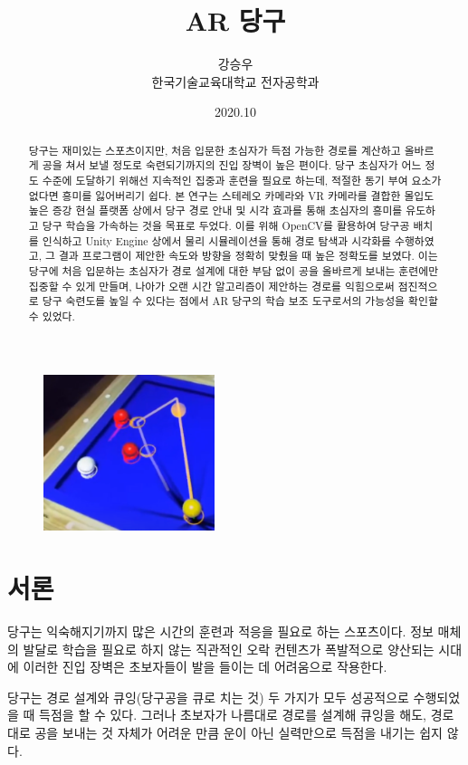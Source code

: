 \documentclass[10pt]{oblivoir}
\title{AR 당구}
\author{강승우 \\ 한국기술교육대학교 전자공학과}
\date{2020.10}
\begin{document}
\maketitle

\begin{figure}[ht]
    \centering
    \includegraphics[width=5cm]{img/abstract-final.png}
\end{figure}

\begin{abstract}
    당구는 재미있는 스포츠이지만, 처음 입문한 초심자가 득점 가능한 경로를 계산하고 올바르게 공을 쳐서 보낼 정도로 숙련되기까지의 진입 장벽이 높은 편이다. 당구 초심자가 어느 정도 수준에 도달하기 위해선 지속적인 집중과 훈련을 필요로 하는데, 적절한 동기 부여 요소가 없다면 흥미를 잃어버리기 쉽다. 본 연구는 스테레오 카메라와 VR 카메라를 결합한 몰입도 높은 증강 현실 플랫폼 상에서 당구 경로 안내 및 시각 효과를 통해 초심자의 흥미를 유도하고 당구 학습을 가속하는 것을 목표로 두었다. 이를 위해 OpenCV를 활용하여 당구공 배치를 인식하고 Unity Engine 상에서 물리 시뮬레이션을 통해 경로 탐색과 시각화를 수행하였고, 그 결과 프로그램이 제안한 속도와 방향을 정확히 맞췄을 때 높은 정확도를 보였다. 이는 당구에 처음 입문하는 초심자가 경로 설계에 대한 부담 없이 공을 올바르게 보내는 훈련에만 집중할 수 있게 만들며, 나아가 오랜 시간 알고리즘이 제안하는 경로를 익힘으로써 점진적으로 당구 숙련도를 높일 수 있다는 점에서 AR 당구의 학습 보조 도구로서의 가능성을 확인할 수 있었다.
\end{abstract}

\newpage
\twocolumn[]

\section{서론}
당구는 익숙해지기까지 많은 시간의 훈련과 적응을 필요로 하는 스포츠이다. 정보 매체의 발달로 학습을 필요로 하지 않는 직관적인 오락 컨텐츠가 폭발적으로 양산되는 시대에 이러한 진입 장벽은 초보자들이 발을 들이는 데 어려움으로 작용한다.

당구는 경로 설계와 큐잉(당구공을 큐로 치는 것) 두 가지가 모두 성공적으로 수행되었을 때 득점을 할 수 있다. 그러나 초보자가 나름대로 경로를 설계해 큐잉을 해도, 경로대로 공을 보내는 것 자체가 어려운 만큼 운이 아닌 실력만으로 득점을 내기는 쉽지 않다.
\end{document}
